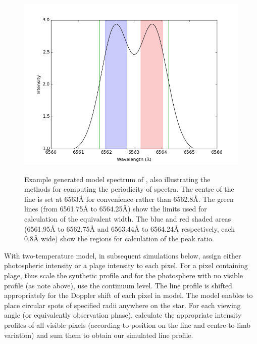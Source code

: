 \begin{figure}[!htbp]
\begin{center}
\includegraphics[scale=0.25]{Figures/integregions.png} \\
\end{center}
\caption{Example generated model spectrum of \prox, also illustrating the methods for computing the periodicity of
  spectra.  The centre of the \ha{} line is set at 6563{\AA} for convenience rather than 6562.8\AA{}.  The green lines
  (from 6561.75{\AA} to 6564.25\AA) show the limits used for calculation of the equivalent width. The blue and red
  shaded areas (6561.95{\AA} to 6562.75{\AA} and 6563.44{\AA} to 6564.24{\AA} respectively, each 0.8{\AA} wide) show the
  regions for calculation of the peak ratio.}
\protect\label{fig:integregions}
\end{figure}

With {\Firstposs} two-temperature model, in subsequent simulations below, {\Firstp} assign either photospheric intensity
or a plage intensity to each pixel. For a pixel containing plage, {\Firstp} thus scale the synthetic {\ha} profile and
for the photosphere with no visible profile (as note above), {\Firstp} use the continuum level. The line profile is
shifted appropriately for the Doppler shift of each pixel in {\Firstposs} model. The model enables {\Firstobj} to place
circular spots of specified radii anywhere on the star. For each viewing angle (or equivalently observation phase),
{\Firstp} calculate the appropriate intensity profiles of all visible pixels (according to position on the line and
centre-to-limb variation) and sum them to obtain our simulated line profile.

